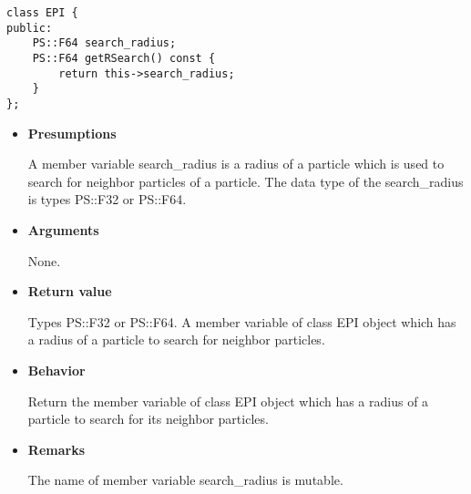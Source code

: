 

\begin{screen}
\begin{verbatim}
class EPI {
public:
    PS::F64 search_radius;
    PS::F64 getRSearch() const {
        return this->search_radius;
    }
};
\end{verbatim}
\end{screen}

\begin{itemize}

\item {\bf Presumptions}

  A member variable search\_radius is a radius of a particle which is
  used to search for neighbor particles of a particle.  The data type
  of the search\_radius is types PS::F32 or PS::F64.
    
\item {\bf Arguments}

  None.
  
\item {\bf Return value}

  Types PS::F32 or PS::F64. A member variable of class EPI object which
  has a radius of a particle to search for neighbor particles.
  
\item {\bf Behavior}

  Return the member variable of class EPI object which has a radius of
  a particle to search for its neighbor particles.

\item {\bf Remarks}

  The name of member variable search\_radius is mutable.
  
\end{itemize}


